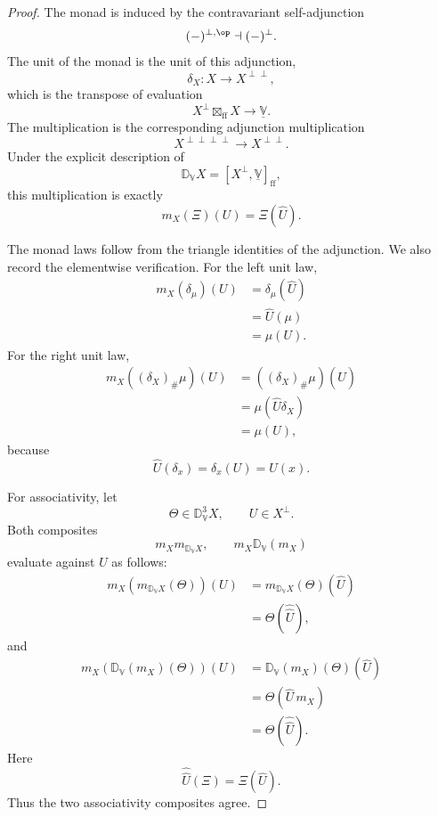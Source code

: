 \begin{proof}
The monad is induced by the contravariant self-adjunction
\[
    (-)^{\perp,\op}
    \dashv
    (-)^{\perp}.
\]
The unit of the monad is the unit of this adjunction,
\[
    \delta_X:X\to X^{\perp\perp},
\]
which is the transpose of evaluation
\[
    X^{\perp}\boxtimes_{\mathrm{ff}}X
    \to
    \underline{\mathbb V}.
\]
The multiplication is the corresponding adjunction multiplication
\[
    X^{\perp\perp\perp\perp}
    \to
    X^{\perp\perp}.
\]
Under the explicit description of
\[
    \mathbb D_{\mathbb V}X
    =
    [X^{\perp},\underline{\mathbb V}]_{\mathrm{ff}},
\]
this multiplication is exactly
\[
    m_X(\Xi)(U)=\Xi(\widehat U).
\]

The monad laws follow from the triangle identities of the adjunction.  We also
record the elementwise verification.  For the left unit law,
\[
\begin{aligned}
    m_X(\delta_{\mu})(U)
    &=
    \delta_{\mu}(\widehat U)\\
    &=
    \widehat U(\mu)\\
    &=
    \mu(U).
\end{aligned}
\]
For the right unit law,
\[
\begin{aligned}
    m_X((\delta_X)_{\#}\mu)(U)
    &=
    ((\delta_X)_{\#}\mu)(\widehat U)\\
    &=
    \mu(\widehat U\delta_X)\\
    &=
    \mu(U),
\end{aligned}
\]
because
\[
    \widehat U(\delta_x)
    =
    \delta_x(U)
    =
    U(x).
\]

For associativity, let
\[
    \Theta\in \mathbb D_{\mathbb V}^{3}X,
    \qquad
    U\in X^{\perp}.
\]
Both composites
\[
    m_X m_{\mathbb D_{\mathbb V}X},
    \qquad
    m_X \mathbb D_{\mathbb V}(m_X)
\]
evaluate against \(U\) as follows:
\[
\begin{aligned}
    m_X(m_{\mathbb D_{\mathbb V}X}(\Theta))(U)
    &=
    m_{\mathbb D_{\mathbb V}X}(\Theta)(\widehat U)\\
    &=
    \Theta(\widehat{\widehat U}),
\end{aligned}
\]
and
\[
\begin{aligned}
    m_X(\mathbb D_{\mathbb V}(m_X)(\Theta))(U)
    &=
    \mathbb D_{\mathbb V}(m_X)(\Theta)(\widehat U)\\
    &=
    \Theta(\widehat U\,m_X)\\
    &=
    \Theta(\widehat{\widehat U}).
\end{aligned}
\]
Here
\[
    \widehat{\widehat U}(\Xi)
    =
    \Xi(\widehat U).
\]
Thus the two associativity composites agree.
\end{proof}


